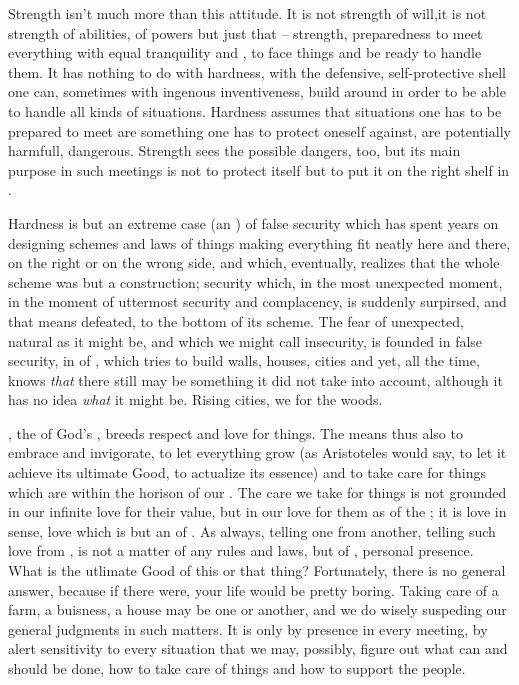 \pa
Strength isn't much more than this attitude. It is 
not strength of will,it is  not strength of abilities, of powers but just 
that -- strength, preparedness to meet everything with equal 
tranquility and , to face things and be ready to handle them. 
It has nothing to do with hardness, with the defensive, 
self-protective shell one can, sometimes with ingenous inventiveness, 
build around in order to be able to handle all kinds of situations. 
Hardness assumes that situations one has to be prepared to meet are 
something one has to protect oneself against, are potentially 
harmfull, dangerous. Strength sees the possible dangers, too, but its 
main purpose in such meetings is not to protect itself but to put it 
on the right shelf in . 

Hardness is but an extreme case (an ) of false security
which has spent years on designing schemes and laws of things making everything
fit neatly here and there, on the right or on the wrong side, and
which, eventually, realizes that the whole scheme was but a
construction; security which, in the most unexpected moment, in the
moment of uttermost security and complacency, is suddenly
surpirsed, and that means defeated, to the bottom of its scheme.  The
fear of unexpected, natural as it might be, and which we might
call insecurity, is founded in false security, in  of
\No, which tries to build walls, houses, cities and yet, all the time,
knows {\em that} there still may be something it did not take into account,
although it has no idea {\em what} it might be.
Rising cities, we  for the woods.


\label{compassion} ,
the  of God's , breeds respect and love
for things.  The  means thus also to embrace and
invigorate, to let everything grow (as Aristoteles would say, to let
it achieve its ultimate Good, to actualize its essence) and to take
care for things which are within the horison of our .  The
care we take for things is not grounded in our infinite love for their
 value, but in our love for them as 
 of the ; it is love in  sense,
love which is but an  of .  As
always, telling one from another, telling such love from
, is not a matter of any rules and laws, but of
, personal presence.  What is the utlimate Good of this
or that thing?  Fortunately, there is no general answer, because if
there were, your life would be pretty boring.  Taking care of a farm,
a buisness, a house may be one or another, and we do wisely suspeding
our general judgments in such matters.  It is only by 
presence in every meeting, by alert sensitivity to every situation
that we may, possibly, figure out what can and should be done, how to
take care of things and how to support the people.

